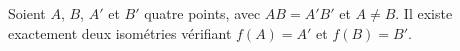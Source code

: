 Soient $A$, $B$, $A'$ et $B'$  quatre points, avec $AB=A'B'$ et $A\neq B$. Il existe exactement deux isométries vérifiant $f(A)=A'$ et $f(B)=B'$.

\begin{reponses}
\end{reponses}

